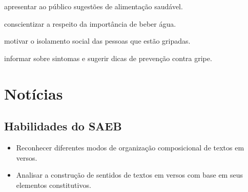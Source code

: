 
\begin{escolha}
\item apresentar ao público sugestões de alimentação saudável.

\item conscientizar a respeito da importância de beber água.

\item motivar o isolamento social das pessoas que estão gripadas.

\item informar sobre sintomas e sugerir dicas de prevenção contra gripe.
\end{escolha}


\chapter{Notícias}


\section*{Habilidades do SAEB}

\begin{itemize}
  \item Reconhecer diferentes modos de organização composicional de textos em versos.

  \item Analisar a construção de sentidos de textos em versos com base em seus elementos constitutivos.
\end{itemize}


